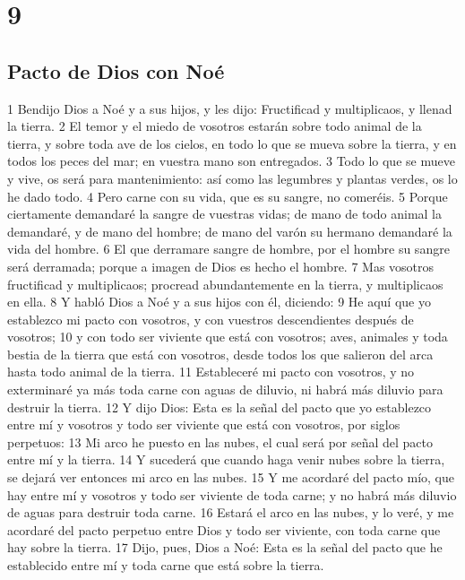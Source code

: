 \chapter{9}

\section*{Pacto de Dios con Noé}

1 Bendijo Dios a Noé y a sus hijos, y les dijo: Fructificad y multiplicaos, y llenad la tierra.
2 El temor y el miedo de vosotros estarán sobre todo animal de la tierra, y sobre toda ave de los cielos, en todo lo que se mueva sobre la tierra, y en todos los peces del mar; en vuestra mano son entregados.
3 Todo lo que se mueve y vive, os será para mantenimiento: así como las legumbres y plantas verdes, os lo he dado todo.
4 Pero carne con su vida, que es su sangre, no comeréis.
5 Porque ciertamente demandaré la sangre de vuestras vidas; de mano de todo animal la demandaré, y de mano del hombre; de mano del varón su hermano demandaré la vida del hombre.
6 El que derramare sangre de hombre, por el hombre su sangre será derramada; porque a imagen de Dios es hecho el hombre.
7 Mas vosotros fructificad y multiplicaos; procread abundantemente en la tierra, y multiplicaos en ella.
8 Y habló Dios a Noé y a sus hijos con él, diciendo:
9 He aquí que yo establezco mi pacto con vosotros, y con vuestros descendientes después de vosotros;
10 y con todo ser viviente que está con vosotros; aves, animales y toda bestia de la tierra que está con vosotros, desde todos los que salieron del arca hasta todo animal de la tierra.
11 Estableceré mi pacto con vosotros, y no exterminaré ya más toda carne con aguas de diluvio, ni habrá más diluvio para destruir la tierra.
12 Y dijo Dios: Esta es la señal del pacto que yo establezco entre mí y vosotros y todo ser viviente que está con vosotros, por siglos perpetuos:
13 Mi arco he puesto en las nubes, el cual será por señal del pacto entre mí y la tierra.
14 Y sucederá que cuando haga venir nubes sobre la tierra, se dejará ver entonces mi arco en las nubes.
15 Y me acordaré del pacto mío, que hay entre mí y vosotros y todo ser viviente de toda carne; y no habrá más diluvio de aguas para destruir toda carne.
16 Estará el arco en las nubes, y lo veré, y me acordaré del pacto perpetuo entre Dios y todo ser viviente, con toda carne que hay sobre la tierra.
17 Dijo, pues, Dios a Noé: Esta es la señal del pacto que he establecido entre mí y toda carne que está sobre la tierra.

